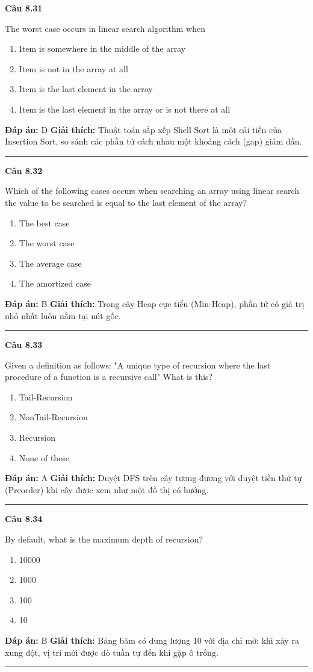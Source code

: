 \documentclass[11pt,a4paper]{article}
\newenvironment{question}[1]{%
  \par\vspace{1em}\noindent\textbf{\large Câu #1}\par\vspace{0.4em}
}{%
  \par\vspace{1em}\hrule\vspace{0.6em}
}
\newenvironment{choices}{%
  \begin{enumerate}[label=\textbf{\Alph*.},leftmargin=2.2em,itemsep=2pt,topsep=3pt]
}{%
  \end{enumerate}
}
\newcommand{\choice}{\item}
\begin{document}
\begin{question}{8.31}
The worst case occurs in linear search algorithm when
\begin{choices}
\choice Item is somewhere in the middle of the array
\choice Item is not in the array at all
\choice Item is the last element in the array
\choice Item is the last element in the array or is not there at all
\end{choices}
\textbf{Đáp án:} D
\textbf{Giải thích:} Thuật toán sắp xếp Shell Sort là một cải tiến của Insertion Sort, so sánh các phần tử cách nhau một khoảng cách (gap) giảm dần.
\end{question}

\begin{question}{8.32}
Which of the following cases occurs when searching an array using linear search the value to be searched is equal to the last element of the array?
\begin{choices}
\choice The best case
\choice The worst case
\choice The average case
\choice The amortized case
\end{choices}
\textbf{Đáp án:} B
\textbf{Giải thích:} Trong cây Heap cực tiểu (Min-Heap), phần tử có giá trị nhỏ nhất luôn nằm tại nút gốc.
\end{question}

\begin{question}{8.33}
Given a definition as follows: "A unique type of recursion where the last procedure of a function is a recursive call" What is this?
\begin{choices}
\choice Tail-Recursion
\choice NonTail-Recursion
\choice Recursion
\choice None of these
\end{choices}
\textbf{Đáp án:} A
\textbf{Giải thích:} Duyệt DFS trên cây tương đương với duyệt tiền thứ tự (Preorder) khi cây được xem như một đồ thị có hướng.
\end{question}

\begin{question}{8.34}
By default, what is the maximum depth of recursion?
\begin{choices}
\choice 10000
\choice 1000
\choice 100
\choice 10
\end{choices}
\textbf{Đáp án:} B
\textbf{Giải thích:} Bảng băm có dung lượng 10 với địa chỉ mở: khi xảy ra xung đột, vị trí mới được dò tuần tự đến khi gặp ô trống.
\end{question}
\end{document}
